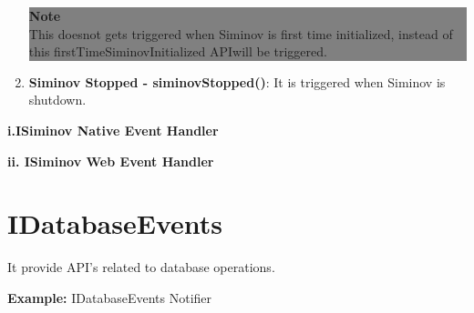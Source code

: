 \begin{enumerate}
					\begin{center}
						\colorbox{grey}{
						\parbox[t]{.8\linewidth}{
							\fontsize{11pt}{11pt}\selectfont %
							\vspace*{0.1cm} %
		
							\hfill \textbf{Note} \\
								This doesnot gets triggered when Siminov is first time initialized, instead of this firstTimeSiminovInitialized APIwill be triggered.

							\vspace*{0.0cm} %
						}
					}

					\end{center}

		
			\item \small \textbf{Siminov Stopped - siminovStopped()}: It is triggered when Siminov is shutdown.


		\end{enumerate}



		\textbf{i.ISiminov  Native Event Handler}
			
			
		
		\textbf{ii. ISiminov Web Event Handler}

			




\section{IDatabaseEvents} It provide API's related to database operations.


		\par
		\textbf{Example:} IDatabaseEvents Notifier
			


